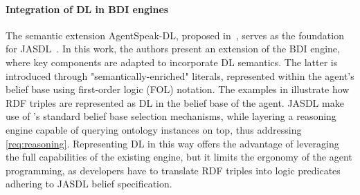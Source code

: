 \documentclass[
]{ceurart}
\begin{document}
\paragraph{Integration of DL in BDI engines}
The semantic extension AgentSpeak-DL, proposed in~\cite{DBLP:conf/dalt/MoreiraVBH05}, serves as the foundation for JASDL~\cite{DBLP:conf/dalt/KlapiscakB08}.
%
In this work, the authors present an extension of the \jason{} \ac{BDI} engine, where key components are adapted to incorporate \ac{DL} semantics.
%
The latter is introduced through "semantically-enriched" literals, represented within the agent's belief base using first-order logic (FOL) notation.
%
The examples in  illustrate how \ac{RDF} triples are represented as \ac{DL} in the belief base of the agent.
%
JASDL make use of \jason{}'s standard belief base selection mechanisms, 
while layering a reasoning engine capable of querying ontology instances on top,
thus addressing \ref{req:reasoning}.
%
Representing \ac{DL} in this way offers the advantage of leveraging the full capabilities of the existing \jason{} engine,
but it limits the ergonomy of the agent programming,
as developers have to translate \ac{RDF} triples into logic predicates adhering to JASDL belief specification.
%

\end{document}
